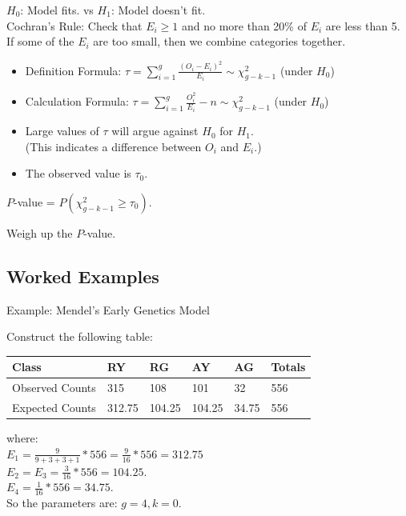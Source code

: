 \documentclass[t,xcolor=pdftex,dvipsnames,table]{beamer}
\begin{document}
\begin{frame}[fragile]{}

 $H_{0}$: Model fits. vs $H_{1}$: Model doesn't fit. \\

 Cochran's Rule: Check that $E_{i} \geq 1$ and no more than 20\% of $E_{i}$ are less than 5. If some of the $E_{i}$ are too small, then we combine categories together.

\begin{itemize}
\item Definition Formula: $\tau = \sum_{i=1}^{g} \frac{(O_{i} - E_{i})^2}{E_{i}} \sim \chi^2_{g-k-1}$ (under $H_{0}$)
\item Calculation Formula: $\tau = \sum_{i=1}^{g} \frac{O_{i}^2}{E_{i}} - n \sim \chi^2_{g-k-1}$ (under $H_{0}$)
\item Large values of $\tau$ will argue against $H_{0}$ for $H_{1}$. \\  
(This indicates a difference between $O_{i}$ and $E_{i}$.)
\item The observed value is $\tau_{0}$. 
\end{itemize}

 $P$-value = $P( \chi^2_{g-k-1} \geq \tau_{0})$.

 Weigh up the $P$-value.
\end{frame}  


\subsection[GoodnessofFit]{Worked Examples}
\begin{frame}[fragile]{Example: Mendel's Early Genetics Model}

Construct the following table:

\begin{center}
\begin{tabular}{|l|llll|l|} \hline
Class & RY & RG & AY & AG  & Totals \\ \hline
Observed Counts & 315  & 108 & 101 & 32 & 556 \\
Expected Counts & 312.75   & 104.25  & 104.25  & 34.75  & 556 \\ \hline
\end{tabular}
\end{center}

where: \\
$E_{1} = \frac{9}{9+3+3+1}*556 = \frac{9}{16}*556 = 312.75$ \\
$E_{2} = E_{3} =  \frac{3}{16}*556  = 104.25$. \\
$E_{4} = \frac{1}{16}*556  = 34.75$.\\

So the parameters are: $g=4, k=0$.
\end{frame} 
\end{document}
